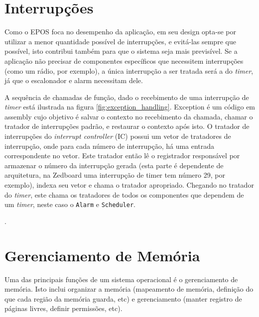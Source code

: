 \section{Interrupções}


Como o EPOS foca no desempenho da aplicação, em seu design opta-se por utilizar a menor quantidade possível de interrupções, e evitá-las sempre que possível, isto contribui também para que o sistema seja mais previsível. Se a aplicação não precisar de componentes específicos que necessitem interrupções (como um rádio, por exemplo), a única interrupção a ser tratada será a do \emph{timer}, já que o escalonador e alarm necessitam dele.


A sequência de chamadas de função, dado o recebimento de uma interrupção de \emph{timer} está ilustrada na figura \ref{fig:exception_handling}. Exception é um código em assembly cujo objetivo é salvar o contexto no recebimento da chamada, chamar o tratador de interrupções padrão, e restaurar o contexto após isto. O tratador de interrupções do \emph{interrupt controller} (IC) possui um vetor de tratadores de interrupção, onde para cada número de interrupção, há uma entrada correspondente no vetor. Este tratador então lê o registrador responsável por armazenar o número da interrupção gerada (esta parte é dependente de arquitetura, na Zedboard uma interrupção de timer tem número 29, por exemplo), indexa seu vetor e chama o tratador apropriado. Chegando no tratador do \emph{timer}, este chama os tratadores de todos os componentes que dependem de um \emph{timer}, neste caso o \verb+Alarm+ e \verb+Scheduler+.

. 



\section{Gerenciamento de Memória}
\label{sec:gerenciamento}
Uma das principais funções de um sistema operacional é o gerenciamento de memória. Isto inclui organizar a memória (mapeamento de memória, definição do que cada região da memória guarda, etc) e gerenciamento (manter registro de páginas livres, definir permissões, etc).

